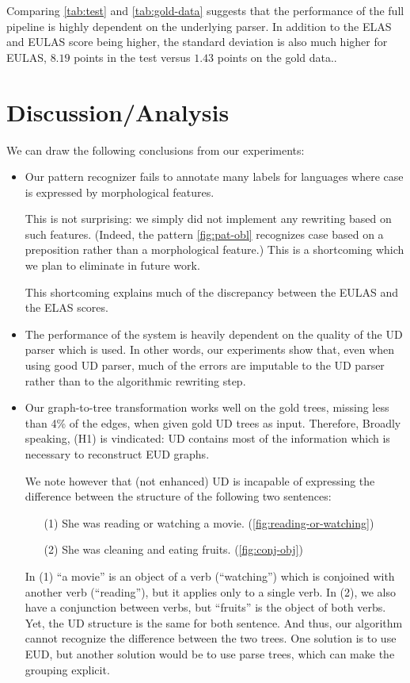 \documentclass[11pt,a4paper]{article}
\begin{document}
Comparing \cref{tab:test} and \cref{tab:gold-data} suggests that the
performance of the full pipeline is highly dependent on the underlying
parser. In addition to the ELAS and EULAS score being higher, the
standard deviation is also much higher for EULAS, $8.19$ points in the
test versus $1.43$ points on the gold data..

\section{Discussion/Analysis}

We can draw the following conclusions from our experiments:

\begin{itemize}
\item
  Our pattern recognizer fails to annotate many labels
  for languages where case is expressed by morphological features.
  
  This is not surprising: we simply did not implement any rewriting
  based on such features. (Indeed, the pattern \cref{fig:pat-obl}
  recognizes case based on a preposition rather than a morphological
  feature.) This is a shortcoming which we plan to eliminate in future
  work.

  This shortcoming explains much of the discrepancy between the EULAS
  and the ELAS scores.
  
\item The performance of the system is heavily dependent on the
  quality of the UD parser which is used. In other words, our
  experiments show that, even when using good UD parser, much of the
  errors are imputable to the UD parser rather than to the algorithmic
  rewriting step.

\item Our graph-to-tree transformation works well on the gold trees,
  missing less than 4\% of the edges, when given gold UD trees as input.
  Therefore, Broadly speaking, (H1) is vindicated: UD contains most of
  the information which is necessary to reconstruct EUD graphs.

  We note however that (not enhanced) UD is incapable of expressing
  the difference between the structure of the following two sentences:
  
  \begin{itemize}
    \item[(1)] She was reading or watching a movie. (\cref{fig:reading-or-watching})
    \item[(2)] She was cleaning and eating fruits. (\cref{fig:conj-obj})
  \end{itemize}
  In (1) ``a movie'' is an object of a verb (``watching'') which
  is conjoined with another verb (``reading''), but it applies only
  to a single verb. In (2), we also have a conjunction between
  verbs, but ``fruits'' is the object of both verbs. Yet, the UD
  structure is the same for both sentence. And thus, our algorithm
  cannot recognize the difference between the two trees.  One
  solution is to use EUD, but another solution would be to use
  parse trees, which can make the grouping explicit.


\end{itemize}
\end{document}
